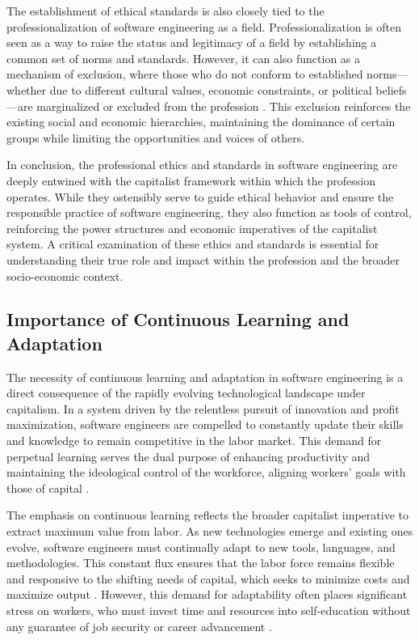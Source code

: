 \begin{refsection}
The establishment of ethical standards is also closely tied to the professionalization of software engineering as a field. Professionalization is often seen as a way to raise the status and legitimacy of a field by establishing a common set of norms and standards. However, it can also function as a mechanism of exclusion, where those who do not conform to established norms—whether due to different cultural values, economic constraints, or political beliefs—are marginalized or excluded from the profession \cite[pp.~94-97]{braverman1974labor}. This exclusion reinforces the existing social and economic hierarchies, maintaining the dominance of certain groups while limiting the opportunities and voices of others.

In conclusion, the professional ethics and standards in software engineering are deeply entwined with the capitalist framework within which the profession operates. While they ostensibly serve to guide ethical behavior and ensure the responsible practice of software engineering, they also function as tools of control, reinforcing the power structures and economic imperatives of the capitalist system. A critical examination of these ethics and standards is essential for understanding their true role and impact within the profession and the broader socio-economic context.

\subsection{Importance of Continuous Learning and Adaptation}

The necessity of continuous learning and adaptation in software engineering is a direct consequence of the rapidly evolving technological landscape under capitalism. In a system driven by the relentless pursuit of innovation and profit maximization, software engineers are compelled to constantly update their skills and knowledge to remain competitive in the labor market. This demand for perpetual learning serves the dual purpose of enhancing productivity and maintaining the ideological control of the workforce, aligning workers' goals with those of capital \cite[pp.~68-72]{braverman1974labor}.

The emphasis on continuous learning reflects the broader capitalist imperative to extract maximum value from labor. As new technologies emerge and existing ones evolve, software engineers must continually adapt to new tools, languages, and methodologies. This constant flux ensures that the labor force remains flexible and responsive to the shifting needs of capital, which seeks to minimize costs and maximize output \cite[pp.~874-876]{marx2008capital}. However, this demand for adaptability often places significant stress on workers, who must invest time and resources into self-education without any guarantee of job security or career advancement \cite[pp.~145-148]{braverman1974labor}.


\end{refsection}
